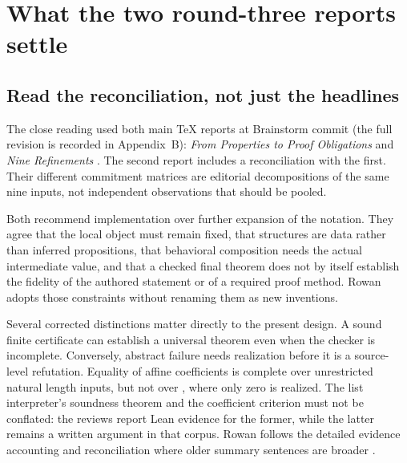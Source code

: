 \documentclass[11pt,letterpaper]{article}
\newcommand{\code}[1]{\texttt{\detokenize{#1}}}
\theoremstyle{definition}\newtheorem{definition}[theorem]{Definition}
\theoremstyle{remark}\newtheorem{remark}[theorem]{Remark}
\begin{document}
\section{What the two round-three reports settle}

\subsection{Read the reconciliation, not just the headlines}
The close reading used both main TeX reports at Brainstorm commit
\code{bf333390} (the full revision is recorded in Appendix~B):
\emph{From Properties to Proof Obligations} and \emph{Nine Refinements}
\cite{round3a,round3b}. The second report includes a reconciliation with the
first. Their different commitment matrices are editorial decompositions of
the same nine inputs, not independent observations that should be pooled.

Both recommend implementation over further expansion of the notation. They
agree that the local object must remain fixed, that structures are data rather
than inferred propositions, that behavioral composition needs the actual
intermediate value, and that a checked final theorem does not by itself
establish the fidelity of the authored statement or of a required proof method.
Rowan adopts those constraints without renaming them as new inventions.

Several corrected distinctions matter directly to the present design. A sound
finite certificate can establish a universal theorem even when the checker is
incomplete. Conversely, abstract failure needs realization before it is a
source-level refutation. Equality of affine coefficients is complete over
unrestricted natural length inputs, but not over \code{List Empty}, where
only zero is realized. The list interpreter's soundness theorem and the
coefficient criterion must not be conflated: the reviews report Lean evidence
for the former, while the latter remains a written argument in that corpus.
Rowan follows the detailed evidence accounting and reconciliation where older
summary sentences are broader \cite{round3a,round3b}.
\end{document}
